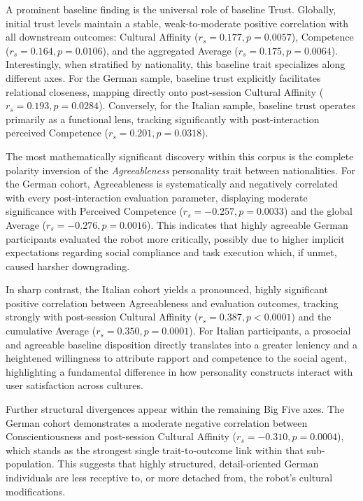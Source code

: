 A prominent baseline finding is the universal role of baseline Trust. 
Globally, initial trust levels maintain a stable, weak-to-moderate positive correlation with all downstream outcomes: Cultural Affinity ($r_s = 0.177, p = 0.0057$), Competence ($r_s = 0.164, p = 0.0106$), and the aggregated Average ($r_s = 0.175, p = 0.0064$). Interestingly, when stratified by nationality, this baseline trait specializes along different axes. 
For the German sample, baseline trust explicitly facilitates relational closeness, mapping directly onto post-session Cultural Affinity ($r_s = 0.193, p = 0.0284$). 
Conversely, for the Italian sample, baseline trust operates primarily as a functional lens, tracking significantly with post-interaction perceived Competence ($r_s = 0.201, p = 0.0318$).

The most mathematically significant discovery within this corpus is the complete polarity inversion of the \textit{Agreeableness} personality trait between nationalities. 
For the German cohort, Agreeableness is systematically and negatively correlated with every post-interaction evaluation parameter, displaying moderate significance with Perceived Competence ($r_s = -0.257, p = 0.0033$) and the global Average ($r_s = -0.276, p = 0.0016$). 
This indicates that highly agreeable German participants evaluated the robot more critically, possibly due to higher implicit expectations regarding social compliance and task execution which, if unmet, caused harsher downgrading. 

In sharp contrast, the Italian cohort yields a pronounced, highly significant positive correlation between Agreeableness and evaluation outcomes, tracking strongly with post-session Cultural Affinity ($r_s = 0.387, p < 0.0001$) and the cumulative Average ($r_s = 0.350, p = 0.0001$). 
For Italian participants, a prosocial and agreeable baseline disposition directly translates into a greater leniency and a heightened willingness to attribute rapport and competence to the social agent, highlighting a fundamental difference in how personality constructs interact with user satisfaction across cultures.

Further structural divergences appear within the remaining Big Five axes. 
The German cohort demonstrates a moderate negative correlation between Conscientiousness and post-session Cultural Affinity ($r_s = -0.310, p = 0.0004$), which stands as the strongest single trait-to-outcome link within that sub-population. 
This suggests that highly structured, detail-oriented German individuals are less receptive to, or more detached from, the robot's cultural modifications. 

